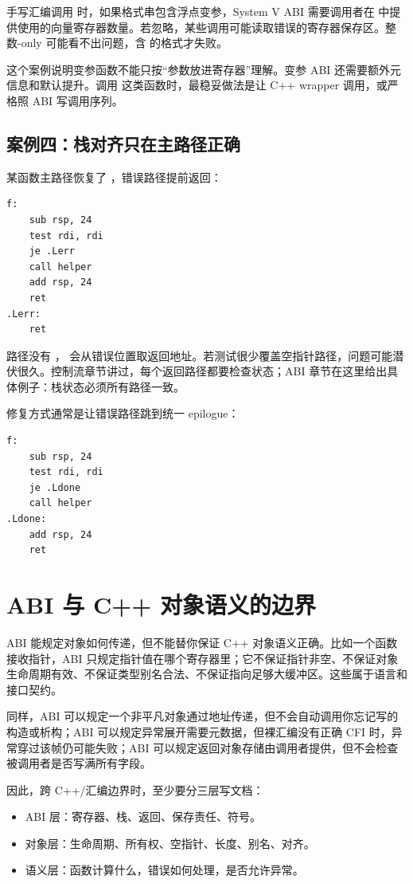 手写汇编调用  时，如果格式串包含浮点变参，System V ABI 需要调用者在  中提供使用的向量寄存器数量。若忽略，某些调用可能读取错误的寄存器保存区。整数-only  可能看不出问题，含  的格式才失败。

这个案例说明变参函数不能只按“参数放进寄存器”理解。变参 ABI 还需要额外元信息和默认提升。调用  这类函数时，最稳妥做法是让 C++ wrapper 调用，或严格照 ABI 写调用序列。

\subsection{案例四：栈对齐只在主路径正确}

某函数主路径恢复了 ，错误路径提前返回：

\begin{lstlisting}
f:
    sub rsp, 24
    test rdi, rdi
    je .Lerr
    call helper
    add rsp, 24
    ret
.Lerr:
    ret
\end{lstlisting}

 路径没有 ， 会从错误位置取返回地址。若测试很少覆盖空指针路径，问题可能潜伏很久。控制流章节讲过，每个返回路径都要检查状态；ABI 章节在这里给出具体例子：栈状态必须所有路径一致。

修复方式通常是让错误路径跳到统一 epilogue：

\begin{lstlisting}
f:
    sub rsp, 24
    test rdi, rdi
    je .Ldone
    call helper
.Ldone:
    add rsp, 24
    ret
\end{lstlisting}

\section{ABI 与 C++ 对象语义的边界}

ABI 能规定对象如何传递，但不能替你保证 C++ 对象语义正确。比如一个函数接收指针，ABI 只规定指针值在哪个寄存器里；它不保证指针非空、不保证对象生命周期有效、不保证类型别名合法、不保证指向足够大缓冲区。这些属于语言和接口契约。

同样，ABI 可以规定一个非平凡对象通过地址传递，但不会自动调用你忘记写的构造或析构；ABI 可以规定异常展开需要元数据，但裸汇编没有正确 CFI 时，异常穿过该帧仍可能失败；ABI 可以规定返回对象存储由调用者提供，但不会检查被调用者是否写满所有字段。

因此，跨 C++/汇编边界时，至少要分三层写文档：

\begin{itemize}
  \item ABI 层：寄存器、栈、返回、保存责任、符号。
  \item 对象层：生命周期、所有权、空指针、长度、别名、对齐。
  \item 语义层：函数计算什么，错误如何处理，是否允许异常。
\end{itemize}

